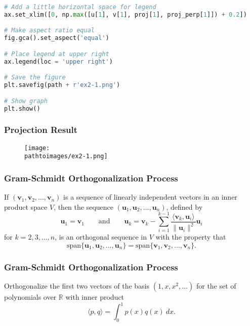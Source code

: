 \documentclass{beamer}
\newcommand{\pathtoimages}{/Users/charlesrambo/Desktop/Bootcamp24/Images}
\begin{document}
\begin{frame}[fragile]
\begin{multicols}{2}
\begin{lstlisting}[language=Python]
# Add a little horizontal space for legend
ax.set_xlim([0, np.max([u[1], v[1], proj[1], proj_perp[1]]) + 0.2])

# Make aspect ratio equal
fig.gca().set_aspect('equal')

# Place legend at upper right
ax.legend(loc = 'upper right')

# Save the figure
plt.savefig(path + r'ex2-1.png')

# Show graph
plt.show()
\end{lstlisting}
\end{multicols}

\end{frame}

\begin{frame}[fragile]
\frametitle{Projection Result}
\begin{figure}
\centering
\texttt{[image: \\pathtoimages/ex2-1.png]}
\end{figure}
\end{frame}


\begin{frame}
\frametitle{Gram-Schmidt Orthogonalization Process}
\begin{Theorem}
If $({\boldsymbol v_1}, {\boldsymbol v_2}, \ldots, {\boldsymbol v_n})$ is a sequence of linearly independent vectors in an inner product space $V$, then the sequence $({\boldsymbol u_1}, {\boldsymbol u_2},\ldots, {\boldsymbol u_n})$, defined by
$$
{\boldsymbol u_1} = {\boldsymbol v_1}\qquad\text{and}\qquad {\boldsymbol u_k} = {\boldsymbol v_k} - \sum_{i = 1}^{k - 1} \frac{\langle {\boldsymbol v_k}, {\boldsymbol u_i}\rangle}{\| {\boldsymbol u_i}\|^2} {\boldsymbol u_i}
$$
for $k = 2, 3,\ldots, n$, is an orthogonal sequence in $V$ with the property that
$$
\text{span}\{{\boldsymbol u_1}, {\boldsymbol u_2},\ldots, {\boldsymbol u_n}\} = \text{span}\{{\boldsymbol v_1}, {\boldsymbol v_2},\ldots, {\boldsymbol v_n}\}.
$$
\end{Theorem}

\end{frame}

\begin{frame}[t]
\frametitle{Gram-Schmidt Orthogonalization Process}
\small
\begin{Example}
Orthogonalize the first two vectors of the basis $(1, x, x^2,\ldots)$ for the set of polynomials over $\mathbb{R}$ with inner product
$$
\langle p, q\rangle = \int_{0}^1 p(x)q(x)\ dx.
$$
\end{Example}


\end{frame}
\end{document}
